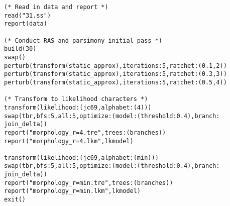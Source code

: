 \begin{verbatim}
(* Read in data and report *)
read("31.ss")
report(data)

(* Conduct RAS and parsimony initial pass *)
build(30)
swap()
perturb(transform(static_approx),iterations:5,ratchet:(0.1,2))
perturb(transform(static_approx),iterations:5,ratchet:(0.3,3))
perturb(transform(static_approx),iterations:5,ratchet:(0.5,4))

(* Transform to likelihood characters *)
transform(likelihood:(jc69,alphabet:(4)))
swap(tbr,bfs:5,all:5,optimize:(model:(threshold:0.4),branch:
join_delta))
report("morphology_r=4.tre",trees:(branches))
report("morphology_r=4.lkm",lkmodel)

transform(likelihood:(jc69,alphabet:(min)))
swap(tbr,bfs:5,all:5,optimize:(model:(threshold:0.4),branch:
join_delta))
report("morphology_r=min.tre",trees:(branches))
report("morphology_r=min.lkm",lkmodel)
exit()
\end{verbatim}

